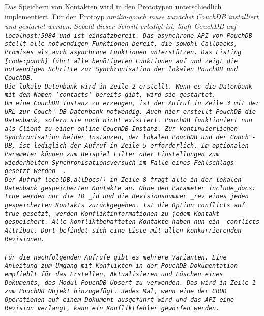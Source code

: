 Das Speichern von Kontakten wird in den Prototypen unterschiedlich implementiert.
%
%
Für den Protoyp \it{amilia-qouch} muss zunächst CouchDB installiert und gestartet werden.
Sobald dieser Schritt erledigt ist, läuft CouchDB auf \tt{localhost:5984} und ist einsatzbereit.
Das asynchrone \gls{API} von PouchDB stellt alle notwendigen Funktionen bereit, die sowohl Callbacks, Promises als auch asynchrone Funktionen unterstützen. 
Das Listing \ref{code:pouch} führt alle benötigeten Funktionen auf und zeigt die notwendigen Schritte zur Synchronisation der lokalen PouchDB und CouchDB.\\
Die lokale Datenbank wird in Zeile 2 erstellt. Wenn es die Datenbank mit dem Namen `contacts` bereits gibt, wird sie gestartet.\\
%
Um eine CouchDB Instanz zu erzeugen, ist der Aufruf in Zeile 3 mit der URL zur Couch"-DB--Datenbank notwendig. Auch hier erstellt PouchDB die Datenbank, sofern sie noch nicht existiert. PouchDB funktioniert nun als Client zu einer online CouchDB Instanz.
Zur kontinuierlichen Synchronisation beider Instanzen, der lokalen PouchDB und der Couch"-DB, ist lediglich der Aufruf in Zeile 5 erforderlich. Im optionalen Parameter können zum Beispiel Filter oder Einstellungen zum wiederholten Synchronisationsversuch im Falle eines Fehlschlags gesetzt werden ~\cite{pouch_options}.\\
Der Aufruf \tt{localDB.allDocs()} in Zeile 8 fragt alle in der lokalen Datenbank gespeicherten Kontakte an.
Ohne den Parameter \tt{include\_docs: true} werden nur die ID \tt{\_id} und die Revisionsnummer \tt{\_rev} eines jeden gespeicherten Kontakts zurückgegeben.
Ist die Option \tt{conflicts} auf \tt{true} gesetzt, werden Konfliktinformationen zu jedem Kontakt gespeichert. Alle konfliktbehafteten Kontakte haben nun ein \tt{\_conflicts} Attribut.
Dort befindet sich eine Liste mit allen konkurrierenden Revisionen.\\\\
%
Für die nachfolgenden Aufrufe gibt es mehrere Varianten.
Eine Anleitung zum Umgang mit Konflikten in der PouchDB Dokumentation empfiehlt für das Erstellen, Aktualisieren und Löschen eines Dokuments, das Modul PouchDB Upsert zu verwenden.
Das wird in Zeile 1 zum PouchDB Objekt hinzugefügt.
Jedes Mal, wenn eine der \gls{CRUD} Operationen auf einem Dokument ausgeführt wird und das \gls{API} eine Revision verlangt, kann ein Konfliktfehler geworfen werden.
